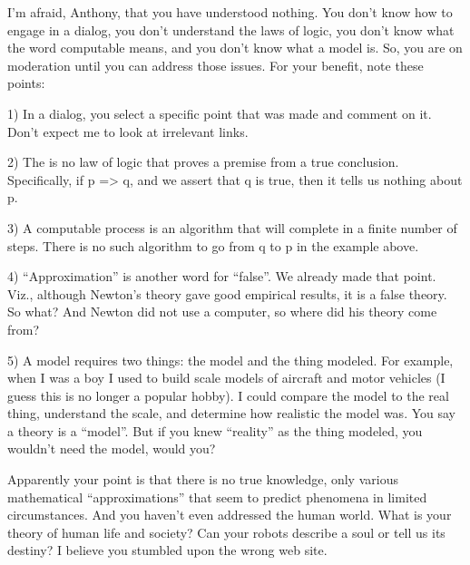 \begin{footnotesize}
\begin{sffamily}
I'm afraid, Anthony, that you have understood nothing. You don't know how to engage in a dialog, you don't understand the laws of logic, you don't know what the word computable means, and you don't know what a model is. So, you are on moderation until you can address those issues. For your benefit, note these points:

1) In a dialog, you select a specific point that was made and comment on it. Don't expect me to look at irrelevant links.

2) The is no law of logic that proves a premise from a true conclusion. Specifically, if p => q, and we assert that q is true, then it tells us nothing about p.

3) A computable process is an algorithm that will complete in a finite number of steps. There is no such algorithm to go from q to p in the example above.

4) ``Approximation'' is another word for ``false''. We already made that point. Viz., although Newton's theory gave good empirical results, it is a false theory. So what? And Newton did not use a computer, so where did his theory come from?

5) A model requires two things: the model and the thing modeled. For example, when I was a boy I used to build scale models of aircraft and motor vehicles (I guess this is no longer a popular hobby). I could compare the model to the real thing, understand the scale, and determine how realistic the model was. You say a theory is a ``model''. But if you knew ``reality'' as the thing modeled, you wouldn't need the model, would you?

Apparently your point is that there is no true knowledge, only various mathematical ``approximations'' that seem to predict phenomena in limited circumstances. And you haven't even addressed the human world. What is your theory of human life and society? Can your robots describe a soul or tell us its destiny? I believe you stumbled upon the wrong web site.


\hfill

\end{sffamily}
\end{footnotesize}

